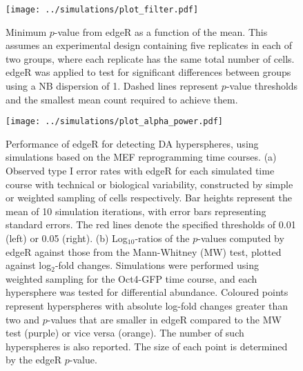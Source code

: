 \documentclass{article}
\begin{document}
\begin{figure}[tbp]
    \begin{center}
    \texttt{[image: ../simulations/plot\_filter.pdf]}
    \end{center}
    \caption{Minimum $p$-value from edgeR as a function of the mean.
        This assumes an experimental design containing five replicates in each of two groups, where each replicate has the same total number of cells.
        edgeR was applied to test for significant differences between groups using a NB dispersion of 1.
        Dashed lines represent $p$-value thresholds and the smallest mean count required to achieve them.
  }
    \label{fig:filter}
\end{figure}

\begin{figure}[btp]
    \begin{center}
        \texttt{[image: ../simulations/plot\_alpha\_power.pdf]}
    \end{center}
    \caption{
        Performance of edgeR for detecting DA hyperspheres, using simulations based on the MEF reprogramming time courses.
        (a) Observed type I error rates with edgeR for each simulated time course with technical or biological variability, constructed by simple or weighted sampling of cells respectively.
        Bar heights represent the mean of 10 simulation iterations, with error bars representing standard errors.
        The red lines denote the specified thresholds of 0.01 (left) or 0.05 (right).
        (b) Log$_{10}$-ratios of the $p$-values computed by edgeR against those from the Mann-Whitney (MW) test, plotted against log$_{2}$-fold changes.
        Simulations were performed using weighted sampling for the Oct4-GFP time course, and each hypersphere was tested for differential abundance.
        Coloured points represent hyperspheres with absolute log-fold changes greater than two and $p$-values that are smaller in edgeR compared to the MW test (purple) or vice versa (orange).
        The number of such hyperspheres is also reported.
        The size of each point is determined by the edgeR $p$-value.
    }
    \label{fig:testtest}
\end{figure}
\end{document}
